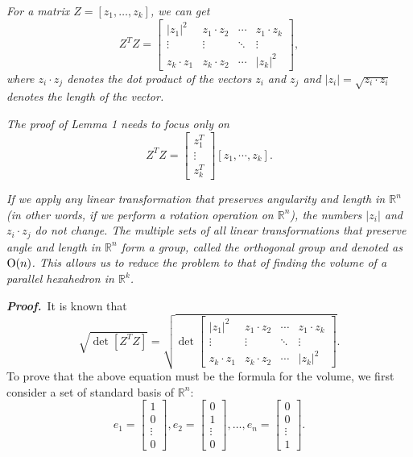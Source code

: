 \documentclass[10pt]{article} %
\begin{document}
\begin{lemma}
\emph{For a matrix $Z = \left[ {{z_1}, \ldots ,{z_k}} \right]$, we can get} \[{Z^T}\!Z = \left[\! {\begin{array}{*{20}{c}}
{{{\left| {{z_1}} \right|}^2}}&{{z_1} \cdot {z_2}}& \cdots &{{z_1} \cdot {z_k}}\\
 \vdots & \vdots & \ddots & \vdots \\
{{z_k} \cdot {z_1}}&{{z_k} \cdot {z_2}}& \cdots &{{{\left| {{z_k}} \right|}^2}}
\end{array}} \!\right],\]
\emph{where ${{z_i} \cdot {z_j}}$ denotes the dot product of the vectors $z_i$ and $z_j$ and $\left| {{z_i}} \right| = \sqrt {{z_i} \cdot {z_i}}$ denotes the length of the vector.}

\emph{The proof of Lemma 1 needs to focus only on}
\[{Z^T}\!Z = \left[\!\! {\begin{array}{*{20}{c}}
{z_1^T}\\
 \vdots \\
{z_k^T}
\end{array}}\!\! \right]\left[ {{z_1}, \cdots ,{z_k}} \right].\]

\emph{If we apply any linear transformation that preserves angularity and length in $\mathbb{R}^n$ (in other words, if we perform a rotation operation on $\mathbb{R}^n$), the numbers $\left| {{z_i}} \right|$ and ${{z_i} \cdot {z_j}}$ do not change. The multiple sets of all linear transformations that preserve angle and length in $\mathbb{R}^n$ form a group, called the orthogonal group and denoted as ${\rm O}\!\left( n \right)$. This allows us to reduce the problem to that of finding the volume of a parallel hexahedron in $\mathbb{R}^k$.}
\end{lemma}


\emph{\textbf{Proof.}} \,It is known that \[ \sqrt {\det\! \left[ {{Z^T}\!Z} \right]} = \sqrt {\det \left[\!\! {\begin{array}{*{20}{c}}
{{{\left| {{z_1}} \right|}^2}}&{{z_1} \cdot {z_2}}& \cdots &{{z_1} \cdot {z_k}}\\
 \vdots & \vdots & \ddots & \vdots \\
{{z_k} \cdot {z_1}}&{{z_k} \cdot {z_2}}& \cdots &{{{\left| {{z_k}} \right|}^2}}
\end{array}}\!\!\right]}.\] To prove that the above equation must be the formula for the volume, we first consider a set of standard basis of $\mathbb{R}^n$: 
\[{e_1} = \left[\! {\begin{array}{*{20}{c}}
1\\
0\\
 \vdots \\
0
\end{array}} \!\right],{e_2} = \left[\! {\begin{array}{*{20}{c}}
0\\
1\\
 \vdots \\
0
\end{array}} \!\right], \ldots ,{e_n} = \left[\! {\begin{array}{*{20}{c}}
0\\
0\\
 \vdots \\
1
\end{array}} \!\right].\]
\end{document}
